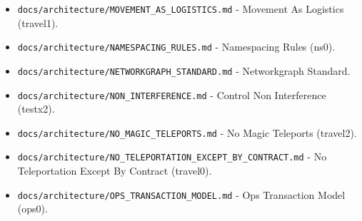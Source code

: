 \documentclass[9pt,a4paper,openany]{book}
\begin{document}
\begin{itemize}
\item \texttt{docs/\allowbreak{}architecture/\allowbreak{}MOVEMENT\_\allowbreak{}AS\_\allowbreak{}LOGISTICS.\allowbreak{}md} -\allowbreak{} Movement As Logistics (travel1).\allowbreak{}
\end{itemize}

\begin{itemize}
\item \texttt{docs/\allowbreak{}architecture/\allowbreak{}NAMESPACING\_\allowbreak{}RULES.\allowbreak{}md} -\allowbreak{} Namespacing Rules (ns0).\allowbreak{}
\end{itemize}

\begin{itemize}
\item \texttt{docs/\allowbreak{}architecture/\allowbreak{}NETWORKGRAPH\_\allowbreak{}STANDARD.\allowbreak{}md} -\allowbreak{} Networkgraph Standard.\allowbreak{}
\end{itemize}

\begin{itemize}
\item \texttt{docs/\allowbreak{}architecture/\allowbreak{}NON\_\allowbreak{}INTERFERENCE.\allowbreak{}md} -\allowbreak{} Control Non Interference (testx2).\allowbreak{}
\end{itemize}

\begin{itemize}
\item \texttt{docs/\allowbreak{}architecture/\allowbreak{}NO\_\allowbreak{}MAGIC\_\allowbreak{}TELEPORTS.\allowbreak{}md} -\allowbreak{} No Magic Teleports (travel2).\allowbreak{}
\end{itemize}

\begin{itemize}
\item \texttt{docs/\allowbreak{}architecture/\allowbreak{}NO\_\allowbreak{}TELEPORTATION\_\allowbreak{}EXCEPT\_\allowbreak{}BY\_\allowbreak{}CONTRACT.\allowbreak{}md} -\allowbreak{} No Teleportation Except By Contract (travel0).\allowbreak{}
\end{itemize}

\begin{itemize}
\item \texttt{docs/\allowbreak{}architecture/\allowbreak{}OPS\_\allowbreak{}TRANSACTION\_\allowbreak{}MODEL.\allowbreak{}md} -\allowbreak{} Ops Transaction Model (ops0).\allowbreak{}
\end{itemize}
\end{document}
